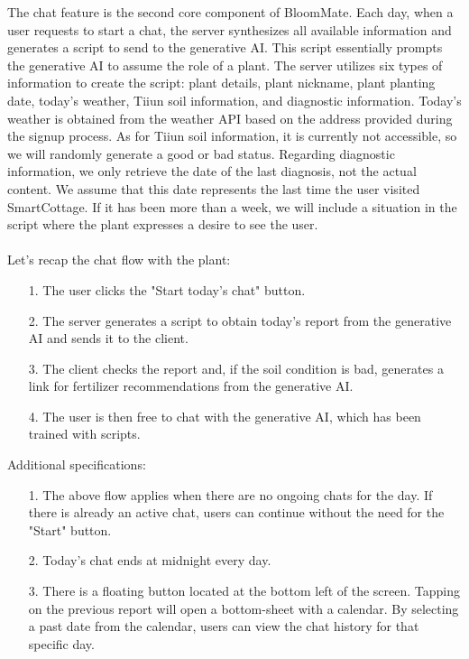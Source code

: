 \documentclass[conference, a4paper]{IEEEtran}
\begin{document}
    The chat feature is the second core component of BloomMate. Each day, when a user requests to start a chat, the server synthesizes all available information and generates a script to send to the generative AI. This script essentially prompts the generative AI to assume the role of a plant. The server utilizes six types of information to create the script: plant details, plant nickname, plant planting date, today's weather, Tiiun soil information, and diagnostic information. Today's weather is obtained from the weather API based on the address provided during the signup process. As for Tiiun soil information, it is currently not accessible, so we will randomly generate a good or bad status. Regarding diagnostic information, we only retrieve the date of the last diagnosis, not the actual content. We assume that this date represents the last time the user visited SmartCottage. If it has been more than a week, we will include a situation in the script where the plant expresses a desire to see the user.\\
\\Let's recap the chat flow with the plant:

\begin{enumerate}
    \item[1.]The user clicks the "Start today's chat" button.
    \item[2.]The server generates a script to obtain today's report from the generative AI and sends it to the client.
    \item[3.]The client checks the report and, if the soil condition is bad, generates a link for fertilizer recommendations from the generative AI.
    \item[4.]The user is then free to chat with the generative AI, which has been trained with scripts.
\end{enumerate}

\noindent Additional specifications:

\begin{enumerate}
    \item[1.]The above flow applies when there are no ongoing chats for the day. If there is already an active chat, users can continue without the need for the "Start" button.
    \item[2.]Today's chat ends at midnight every day.
    \item[3.]There is a floating button located at the bottom left of the screen. Tapping on the previous report will open a bottom-sheet with a calendar. By selecting a past date from the calendar, users can view the chat history for that specific day. \\
\end{enumerate}
\end{document}
